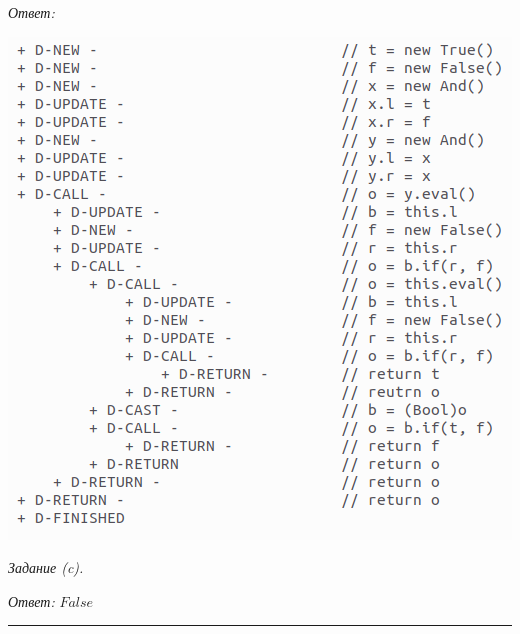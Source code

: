 \documentclass[landscape, 11pt]{report}
\begin{document}
	\textit{Ответ:}
	
	\begin{center}
		\includegraphics[scale=0.6]{solution}
	\end{center}

	\vspace{0.5cm}

	\textit{Задание (c).}
	
	\vspace{0.1cm}
	
	\textit{Ответ:} $False$	
	
	\vspace{0.2cm}
	\hrule
	
\end{document}
